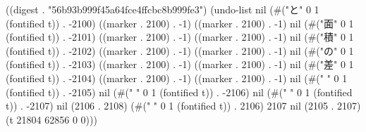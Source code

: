 
((digest . "56b93b999f45a64fce4ffcbc8b999fe3") (undo-list nil (#("と" 0 1 (fontified t)) . -2100) ((marker . 2100) . -1) ((marker . 2100) . -1) nil (#("面" 0 1 (fontified t)) . -2101) ((marker . 2100) . -1) ((marker . 2100) . -1) nil (#("積" 0 1 (fontified t)) . -2102) ((marker . 2100) . -1) ((marker . 2100) . -1) nil (#("の" 0 1 (fontified t)) . -2103) ((marker . 2100) . -1) ((marker . 2100) . -1) nil (#("差" 0 1 (fontified t)) . -2104) ((marker . 2100) . -1) ((marker . 2100) . -1) nil (#("
" 0 1 (fontified t)) . -2105) nil (#("
" 0 1 (fontified t)) . -2106) nil (#(" " 0 1 (fontified t)) . -2107) nil (2106 . 2108) (#(" " 0 1 (fontified t)) . 2106) 2107 nil (2105 . 2107) (t 21804 62856 0 0)))
